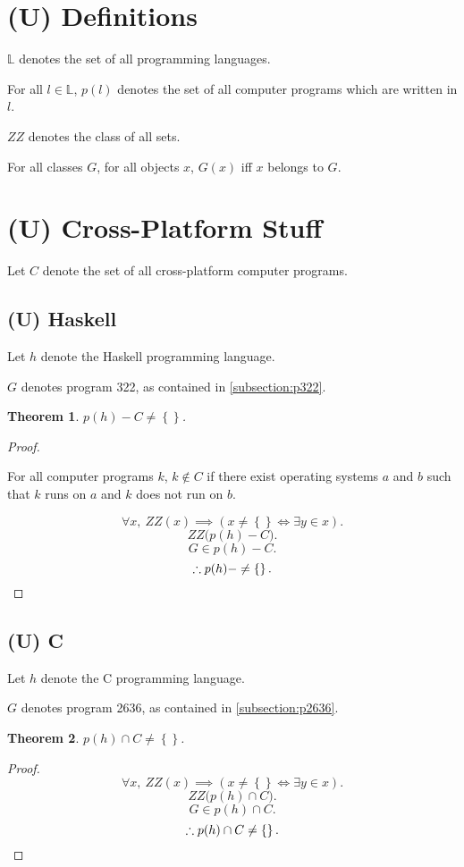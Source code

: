 \documentclass{article}
\newtheorem{thm}{Theorem}
\begin{document}
	\section{(U) Definitions}
		$\mathbb L$ denotes the set of all programming languages.

		For all $l \in \mathbb L$, $p(l)$ denotes the set of all computer
		programs which are written in $l$.

		$\mathit{ZZ}$ denotes the class of all sets.

		For all classes $G$, for all objects $x$, $G(x)$ iff $x$ belongs to
		$G$.
	\section{(U) Cross-Platform Stuff}
			Let $C$ denote the set of all cross-platform computer programs.
		\subsection{(U) Haskell}
			Let $h$ denote the Haskell programming language.

			$G$ denotes program 322, as contained in \cref{subsection:p322}.
			\begin{thm}
				$p(h) - C \neq \left\{\right\}$.
			\end{thm}
			\begin{proof}
				${}$

				For all computer programs $k$, $k \notin C$ if there exist
				operating systems $a$ and $b$ such that $k$ runs on $a$ and
				$k$ does not run on $b$.

				\[
					\forall x,\ 
					\mathit{ZZ}(x) \implies 
					\left(x \neq \left\{\right\} \iff \exists y \in x\right).
				\]
				\[
					\mathit{ZZ}\big(p(h) - C\big).
				\]
				\[
					G \in p(h) - C.
				\]
				\[
					\therefore p(h) -  \neq \left\{\right\}.\qedhere
				\]
			\end{proof}
		\subsection{(U) C}
			Let $h$ denote the C programming language.

			$G$ denotes program 2636, as contained in \cref{subsection:p2636}.
			\begin{thm}
				$p(h) \cap C \neq \left\{\right\}$.
			\end{thm}
			\begin{proof}
				\[
					\forall x,\ 
					\mathit{ZZ}(x) \implies 
					\left(x \neq \left\{\right\} \iff \exists y \in x\right).
				\]
				\[
					\mathit{ZZ}\big(p(h) \cap C\big).
				\]
				\[
					G \in p(h) \cap C.
				\]
				\[
					\therefore p(h) \cap C \neq \left\{\right\}.\qedhere
				\]
			\end{proof}
\end{document}
